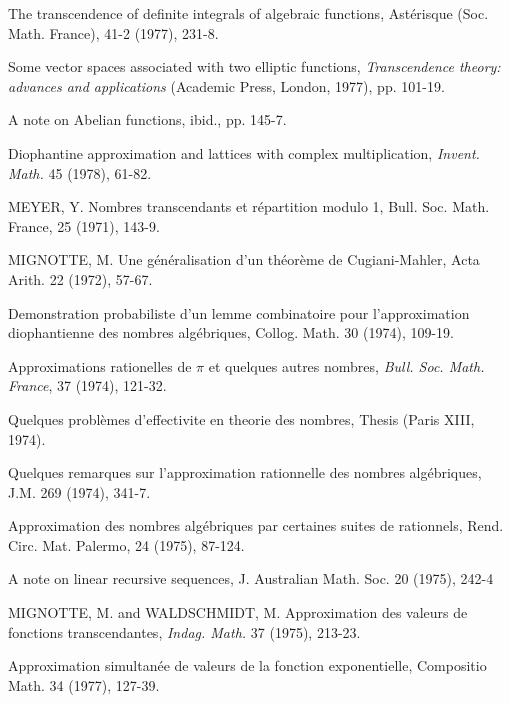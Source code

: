 \begin{hanglist}
    \item The transcendence of definite integrals of algebraic functions, Astérisque (Soc. Math. France), 41-2 (1977), 231-8.
    \item Some vector spaces associated with two elliptic functions, \textit{Transcendence theory: advances and applications} (Academic Press, London, 1977), pp. 101-19.
    \item A note on Abelian functions, ibid., pp. 145-7.
    \item Diophantine approximation and lattices with complex multiplication, \textit{Invent. Math.} 45 (1978), 61-82.
    \item MEYER, Y. Nombres transcendants et répartition modulo 1, Bull. Soc. Math. France, 25 (1971), 143-9.
    \item MIGNOTTE, M. Une généralisation d'un théorème de Cugiani-Mahler, Acta Arith. 22 (1972), 57-67.
    \item \hspace{1.5em} Demonstration probabiliste d'un lemme combinatoire pour l'approximation diophantienne des nombres algébriques, Collog. Math. 30 (1974), 109-19.
    \item \hspace{1.5em} Approximations rationelles de  $\pi$  et quelques autres nombres, \textit{Bull. Soc. Math. France}, 37 (1974), 121-32.
    \item \hspace{1.5em} Quelques problèmes d'effectivite en theorie des nombres, Thesis (Paris XIII, 1974).
    \item \hspace{1.5em} Quelques remarques sur l'approximation rationnelle des nombres algébriques, J.M. 269 (1974), 341-7.
    \item \hspace{1.5em} Approximation des nombres algébriques par certaines suites de rationnels, Rend. Circ. Mat. Palermo, 24 (1975), 87-124.
    \item \hspace{1.5em} A note on linear recursive sequences, J. Australian Math. Soc. 20 (1975), 242-4
    \item MIGNOTTE, M. and WALDSCHMIDT, M. Approximation des valeurs de fonctions transcendantes, \textit{Indag. Math.} 37 (1975), 213-23.
    \item \hspace{1.5em} Approximation simultanée de valeurs de la fonction exponentielle, Compositio Math. 34 (1977), 127-39.

\end{hanglist}

